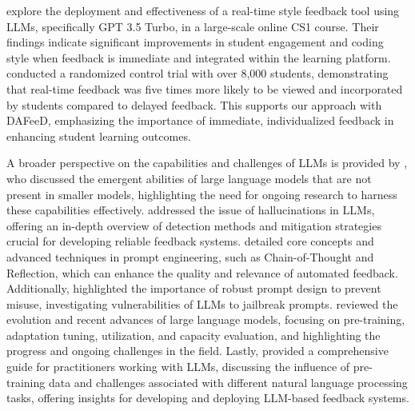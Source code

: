 \documentclass[manuscript,screen,review]{acmart}
\begin{document}
\citet{woodrow:2024:AITeachesArt} explore the deployment and effectiveness of a real-time style feedback tool using LLMs, specifically GPT 3.5 Turbo, in a large-scale online CS1 course. Their findings indicate significant improvements in student engagement and coding style when feedback is immediate and integrated within the learning platform. \citeauthor{woodrow:2024:AITeachesArt} conducted a randomized control trial with over 8,000 students, demonstrating that real-time feedback was five times more likely to be viewed and incorporated by students compared to delayed feedback. This supports our approach with DAFeeD, emphasizing the importance of immediate, individualized feedback in enhancing student learning outcomes.

A broader perspective on the capabilities and challenges of LLMs is provided by \citet{wei:2022:EmergentAbilitiesLarge}, who discussed the emergent abilities of large language models that are not present in smaller models, highlighting the need for ongoing research to harness these capabilities effectively. \citet{huang:2023:SurveyHallucinationLargeb} addressed the issue of hallucinations in LLMs, offering an in-depth overview of detection methods and mitigation strategies crucial for developing reliable feedback systems. \citet{amatriain:2024:PromptDesignEngineering} detailed core concepts and advanced techniques in prompt engineering, such as Chain-of-Thought and Reflection, which can enhance the quality and relevance of automated feedback. Additionally, \citet{liu:2024:JailbreakingChatGPTPrompt} highlighted the importance of robust prompt design to prevent misuse, investigating vulnerabilities of LLMs to jailbreak prompts. \citet{zhao:2023:SurveyLargeLanguage} reviewed the evolution and recent advances of large language models, focusing on pre-training, adaptation tuning, utilization, and capacity evaluation, and highlighting the progress and ongoing challenges in the field. Lastly, \citet{yang:2024:HarnessingPowerLLMs} provided a comprehensive guide for practitioners working with LLMs, discussing the influence of pre-training data and challenges associated with different natural language processing tasks, offering insights for developing and deploying LLM-based feedback systems.
\end{document}
